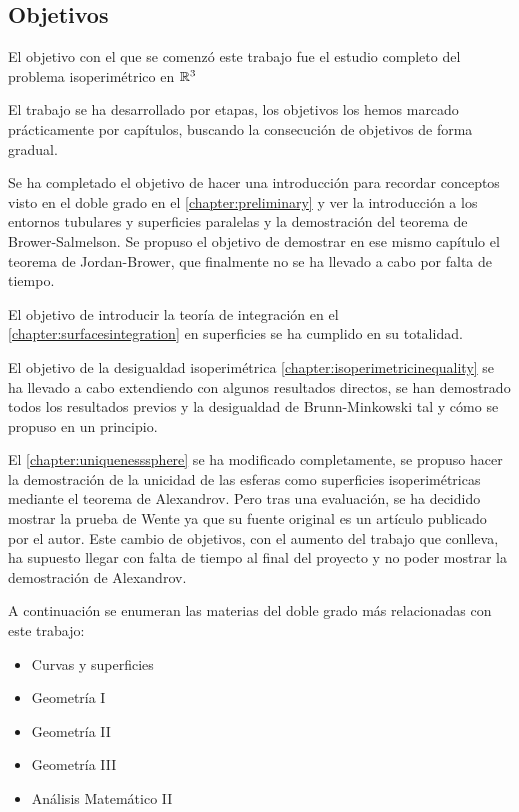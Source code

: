 \subsection{Objetivos}

El objetivo con el que se comenzó este trabajo fue el estudio completo del problema isoperimétrico en $\mathbb{R}^3$

El trabajo se ha desarrollado por etapas, los objetivos los hemos marcado prácticamente por capítulos, buscando la consecución de objetivos de forma gradual. 

Se ha completado el objetivo de hacer una introducción para recordar conceptos visto en el doble grado en el \autoref{chapter:preliminary} y ver la introducción a los entornos tubulares y superficies paralelas y la demostración del teorema de Brower-Salmelson. Se propuso el objetivo de demostrar en ese mismo capítulo el teorema de Jordan-Brower, que finalmente no se ha llevado a cabo por falta de tiempo.

El objetivo de introducir la teoría de integración en el \autoref{chapter:surfacesintegration} en superficies se ha cumplido en su totalidad.

El objetivo de la desigualdad isoperimétrica \autoref{chapter:isoperimetricinequality} se ha llevado a cabo extendiendo con algunos resultados directos, se han demostrado todos los resultados previos y la desigualdad de Brunn-Minkowski tal y cómo se propuso en un principio.

El \autoref{chapter:uniquenesssphere} se ha modificado completamente, se propuso hacer la demostración de la unicidad de las esferas como superficies isoperimétricas mediante el teorema de Alexandrov. Pero tras una evaluación, se ha decidido mostrar la prueba de Wente ya que su fuente original es un artículo publicado por el autor. Este cambio de objetivos, con el aumento del trabajo que conlleva, ha supuesto llegar con falta de tiempo al final del proyecto y no poder mostrar la demostración de Alexandrov.

A continuación se enumeran las materias del doble grado más relacionadas con este trabajo:
\begin{itemize}
\item Curvas y superficies
\item Geometría I
\item Geometría II
\item Geometría III
\item Análisis Matemático II
\end{itemize}

\newpage
